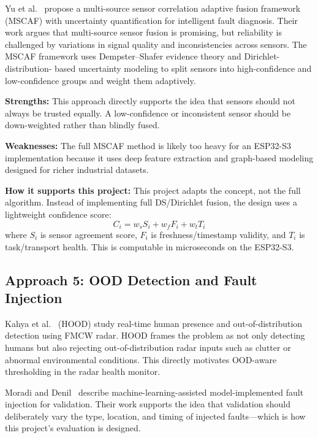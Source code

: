 \documentclass[12pt]{extarticle}
\begin{document}
Yu et al.~\cite{yu2026mscaf} propose a multi-source sensor correlation adaptive
fusion framework (MSCAF) with uncertainty quantification for intelligent fault
diagnosis.
Their work argues that multi-source sensor fusion is promising, but reliability is
challenged by variations in signal quality and inconsistencies across sensors.
The MSCAF framework uses Dempster--Shafer evidence theory and Dirichlet-distribution-
based uncertainty modeling to split sensors into high-confidence and low-confidence
groups and weight them adaptively.

\textbf{Strengths:}
This approach directly supports the idea that sensors should not always be trusted
equally.
A low-confidence or inconsistent sensor should be down-weighted rather than blindly
fused.

\textbf{Weaknesses:}
The full MSCAF method is likely too heavy for an ESP32-S3 implementation because it
uses deep feature extraction and graph-based modeling designed for richer industrial
datasets.

\textbf{How it supports this project:}
This project adapts the concept, not the full algorithm.
Instead of implementing full DS/Dirichlet fusion, the design uses a lightweight
confidence score:
\begin{equation}
  C_i = w_s S_i + w_f F_i + w_t T_i
  \label{eq:confidence}
\end{equation}
where $S_i$ is sensor agreement score, $F_i$ is freshness/timestamp validity, and
$T_i$ is task/transport health.
This is computable in microseconds on the ESP32-S3.

\subsection{Approach 5: OOD Detection and Fault Injection}

Kahya et al.~\cite{kahya2025hood} (HOOD) study real-time human presence and
out-of-distribution detection using FMCW radar.
HOOD frames the problem as not only detecting humans but also rejecting
out-of-distribution radar inputs such as clutter or abnormal environmental conditions.
This directly motivates OOD-aware thresholding in the radar health monitor.

Moradi and Denil~\cite{moradi2020faultinj} describe machine-learning-assisted
model-implemented fault injection for validation.
Their work supports the idea that validation should deliberately vary the type,
location, and timing of injected faults---which is how this project's evaluation is
designed.
\end{document}
